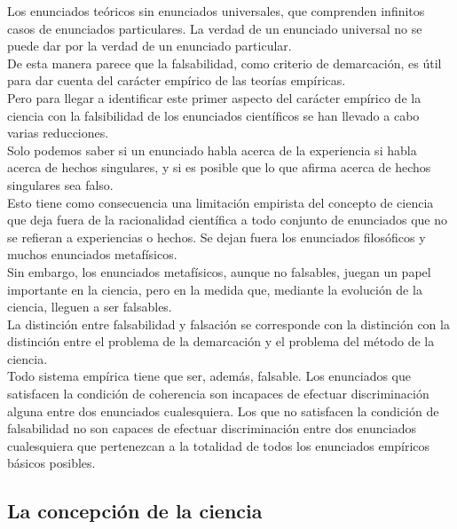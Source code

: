 \documentclass[a4paper, 11pt, twocolumn, spanish]{article}
\begin{document}
Los enunciados teóricos sin enunciados universales, que comprenden
infinitos casos de enunciados particulares. La verdad de un enunciado
universal no se puede dar por la verdad de un enunciado particular.\\[0pt]
De esta manera parece que la falsabilidad, como criterio de
demarcación, es útil para dar cuenta del carácter empírico de las
teorías empíricas.\\[0pt]

Pero para llegar a identificar este primer aspecto del carácter
empírico de la ciencia con la falsibilidad de los enunciados
científicos se han llevado a cabo varias reducciones.\\[0pt]
Solo podemos saber si un enunciado habla acerca de la experiencia si
habla acerca de hechos singulares, y si es posible que lo que afirma
acerca de hechos singulares sea falso.\\[0pt]

Esto tiene como consecuencia una limitación empirista del concepto de
ciencia que deja fuera de la racionalidad científica a todo conjunto
de enunciados que no se refieran a experiencias o hechos. Se dejan
fuera los enunciados filosóficos y muchos enunciados metafísicos.\\[0pt]
Sin embargo, los enunciados metafísicos, aunque no falsables, juegan
un papel importante en la ciencia, pero en la medida que, mediante la
evolución de la ciencia, lleguen a ser falsables.\\[0pt]

La distinción entre falsabilidad y falsación se corresponde con la
distinción con la distinción entre el problema de la demarcación y el
problema del método de la ciencia.\\[0pt]
Todo sistema empírica tiene que ser, además, falsable. Los enunciados
que satisfacen la condición de coherencia son incapaces de efectuar
discriminación alguna entre dos enunciados cualesquiera. Los que no
satisfacen la condición de falsabilidad no son capaces de efectuar
discriminación entre dos enunciados cualesquiera que pertenezcan a la
totalidad de todos los enunciados empíricos básicos posibles.

\subsection{La concepción de la ciencia}
\label{sec:orgbdf28cc}
\end{document}
